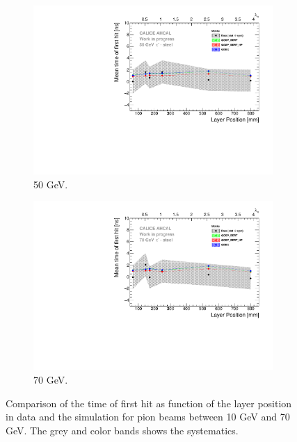 \begin{figure}[htbp!]
\begin{subfigure}[t]{0.49\textwidth}
    \includegraphics[width=1\textwidth]{../Thesis_Plots/Timing/Pions/Plots/ComparisonToSim/Time_Depth_50GeV_Mokka.pdf}
    \caption{50 GeV.} \label{fig:Depth_SimData_50GeV}
  \end{subfigure}
  \hfill
  \begin{subfigure}[t]{0.49\textwidth}
    \centering
    \includegraphics[width=1\textwidth]{../Thesis_Plots/Timing/Pions/Plots/ComparisonToSim/Time_Depth_70GeV_Mokka.pdf}
    \caption{70 GeV.} \label{fig:Depth_SimData_70GeV}
  \end{subfigure}
  \caption{Comparison of the time of first hit as function of the layer position in data and the \mokka simulation for pion beams between 10 GeV and 70 GeV. The grey and color bands shows the systematics.}
\end{figure}

